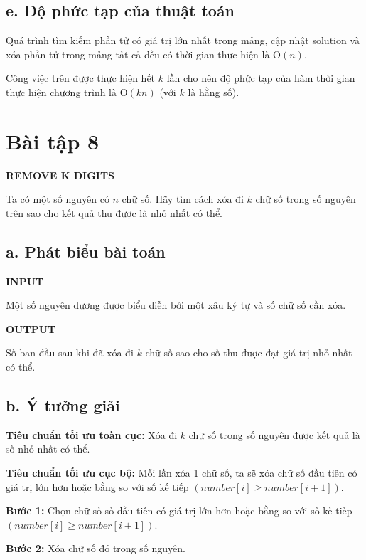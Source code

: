 \documentclass[12pt, a4paper, fleqn]{article}
\begin{document}
	\subsection*{e. Độ phức tạp của thuật toán}
	
		Quá trình tìm kiếm phần tử có giá trị lớn nhất trong mảng, cập nhật solution và xóa phần tử trong mảng tất cả đều có thời gian thực hiện là O$(n)$.
	
		Công việc trên được thực hiện hết $k$ lần cho nên độ phức tạp của hàm thời gian thực hiện chương trình là O$(kn)$ (với $k$ là hằng số).
	
	\clearpage
	
	\section*{Bài tập 8}
	
	
	\textbf{REMOVE K DIGITS}
	
	Ta có một số nguyên có $n$ chữ số. Hãy tìm cách	xóa đi $k$ chữ số trong số nguyên trên sao cho kết	quả thu được là nhỏ nhất có thể.
	
	\subsection*{a. Phát biểu bài toán}
	
	\textbf{INPUT}
	
	Một số nguyên dương được biểu diễn bởi một xâu ký tự và số chữ số cần xóa.
	
	\textbf{OUTPUT}
	
	Số ban đầu sau khi đã xóa đi $k$ chữ số sao cho số thu được đạt giá trị nhỏ nhất có thể.
	
	\subsection*{b. Ý tưởng giải}
	
	\textbf{Tiêu chuẩn tối ưu toàn cục:} Xóa đi $k$ chữ số trong số nguyên được kết quả là số nhỏ nhất có thể.
	
	\textbf{Tiêu chuẩn tối ưu cục bộ:} Mỗi lần xóa 1 chữ số, ta sẽ xóa chữ số đầu tiên có giá trị lớn hơn hoặc bằng so với số kế tiếp $(number[i] \geq number[i + 1])$.
	
	\textbf{Bước 1:} Chọn chữ số số đầu tiên có giá trị lớn hơn hoặc bằng so với số kế tiếp $(number[i] \geq number[i + 1])$.
	
	\textbf{Bước 2:} Xóa chữ số đó trong số nguyên.
	
\end{document}

